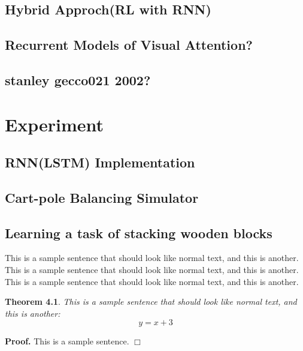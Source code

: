 \documentclass[officiallayout]{tktla}
\newtheorem{theorem}{Theorem}[chapter]
\newenvironment{proof}{\noindent\textbf{Proof.} }{$\Box$}
\begin{document}
\section{Hybrid Approch(RL with RNN)}
\section{Recurrent Models of Visual Attention?}       
\section{stanley gecco021 2002?}
\chapter{Experiment}
\section{RNN(LSTM) Implementation}
\section{Cart-pole Balancing Simulator}
\section{Learning a task of stacking wooden blocks}

This is a sample sentence that should look like normal text, and this
is another. This is a sample sentence that should look like normal
text, and this is another. This is a sample sentence that should look
like normal text, and this is another.


\begin{theorem}
This is a sample sentence that should look like normal text,
and this is another:
\[ y = x+3 \]
\end{theorem}

\begin{proof}
This is a sample sentence.
\end{proof}



\end{document}

